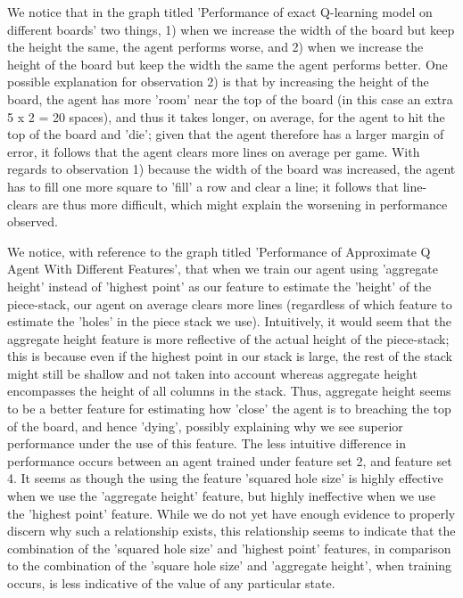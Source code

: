 \documentclass[11pt]{article}
\begin{document}
\bigskip

We notice that in the graph titled 'Performance of exact Q-learning model on different boards' two things, 1) when we increase the width of the board but keep the height the same, the agent performs worse, and 2) when we increase the height of the board but keep the width the same the agent performs better. One possible explanation for observation 2) is that by increasing the height of the board, the agent has more 'room' near the top of the board (in this case an extra 5 x 2 = 20 spaces), and thus it takes longer, on average, for the agent to hit the top of the board and 'die'; given that the agent therefore has a larger margin of error, it follows that the agent clears more lines on average per game. With regards to observation 1) because the width of the board was increased, the agent has to fill one more square to 'fill' a row and clear a line; it follows that line-clears are thus more difficult, which might explain the worsening in performance observed.

\bigskip
We notice, with reference to the graph titled 'Performance of Approximate Q Agent With Different Features', that when we train our agent using 'aggregate height' instead of 'highest point' as our feature to estimate the 'height' of the piece-stack, our agent on average clears more lines (regardless of which feature to estimate the 'holes' in the piece stack we use). Intuitively, it would seem that the aggregate height feature is more reflective of the actual height of the piece-stack; this is because even if the highest point in our stack is large, the rest of the stack might still be shallow and not taken into account whereas aggregate height encompasses the height of all columns in the stack. Thus, aggregate height seems to be a better feature for estimating how 'close' the agent is to breaching the top of the board, and hence 'dying', possibly explaining why we see superior performance under the use of this feature. The less intuitive difference in performance occurs between an agent trained under feature set 2, and feature set 4. It seems as though the using the feature 'squared hole size' is highly effective when we use the 'aggregate height' feature, but highly ineffective when we use the 'highest point' feature. While we do not yet have enough evidence to properly discern why such a relationship exists, this relationship seems to indicate that the combination of the 'squared hole size' and 'highest point' features, in comparison to the combination of the 'square hole size' and 'aggregate height', when training occurs, is less indicative of the value of any particular state.
\end{document}
